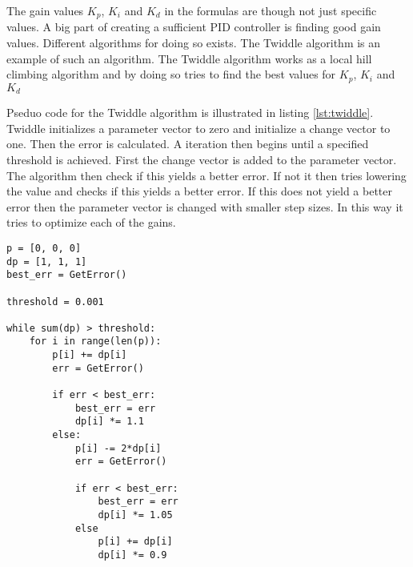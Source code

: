 
\FloatBarrier


The gain values $K_p$, $K_i$ and $K_d$ in the formulas are though not just specific values. A big part of creating a sufficient PID controller is finding good gain values. Different algorithms for doing so exists. The Twiddle algorithm is an example of such an algorithm. The Twiddle algorithm works as a local hill climbing algorithm and by doing so tries to find the best values for $K_p$, $K_i$ and $K_d$

Pseduo code for the Twiddle algorithm is illustrated in listing \ref{lst:twiddle}. Twiddle initializes a parameter vector to zero and initialize a change vector to one.  Then the error is calculated. A iteration then begins until a specified threshold is achieved. First the change vector is added to the parameter vector. The algorithm then check if this yields a better error. If not it then tries lowering the value and checks if this yields a better error. If this does not yield a better error then the parameter vector is changed with smaller step sizes.  In this way it tries to optimize each of the gains.

\newpage

\begin{lstlisting}[caption={Pseduo code for Twiddle}, label=lst:twiddle, mathescape=true]
p = [0, 0, 0]
dp = [1, 1, 1]
best_err = GetError()

threshold = 0.001

while sum(dp) > threshold:
	for i in range(len(p)):
		p[i] += dp[i]
		err = GetError()
		
		if err < best_err: 
			best_err = err
			dp[i] *= 1.1
		else: 
			p[i] -= 2*dp[i]
			err = GetError()
		
			if err < best_err:
				best_err = err
				dp[i] *= 1.05
			else 
				p[i] += dp[i]
				dp[i] *= 0.9
	\end{lstlisting}
\citep{feedbackSystem}